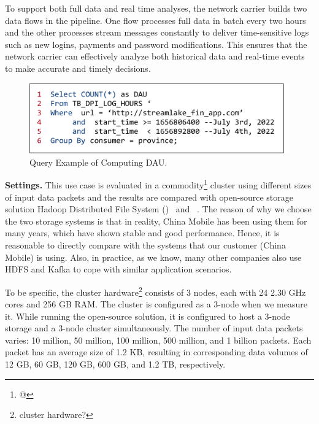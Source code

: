To support both full data and real time analyses, the network carrier builds two data flows in the pipeline. One flow processes full data in batch every two hours and the other processes stream messages constantly to deliver time-sensitive logs such as new logins, payments and password modifications. This ensures that the network carrier can effectively analyze both historical data and real-time events to make  accurate and timely decisions.

 \begin{figure}[htbp]
	\includegraphics[scale=0.35]{figures/sql}
	\centering
	\vspace{-1em}
	\caption{Query Example of Computing DAU.}
	\label{exp:fig:sql}
\end{figure}

\noindent \textbf{Settings.} This use case is evaluated in a commodity\footnote{@} cluster using different sizes of input data packets and the results are compared with open-source storage solution Hadoop Distributed File System (\hdfs)~\cite{} and \kafka~\cite{}. The reason of why we choose the two storage systems is that in reality, China Mobile has been using them for many years, which have shown stable and good performance. Hence, it is  reasonable to directly compare with the systems that our customer (China Mobile) is using. Also, in practice, as we know, many other companies also use HDFS and Kafka to cope with similar application scenarios.


 
  To be specific, the cluster hardware\footnote{cluster hardware?}  consists of 3 nodes, each with 24  2.30 GHz cores and 256 GB RAM. The cluster is configured as a 3-node \sys when we measure it.  While running the open-source solution, it is configured to host a 3-node \hdfs storage and a 3-node \kafka cluster simultaneously. The number of input data packets varies: 10 million, 50 million, 100 million, 500 million, and 1 billion packets. Each packet has an average size of 1.2 KB, resulting in corresponding data volumes of 12 GB, 60 GB, 120 GB, 600 GB, and 1.2 TB, respectively.


